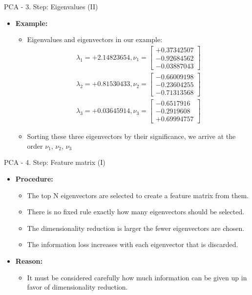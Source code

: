 \begin{frame}{PCA - 3. Step: Eigenvalues (II)}
	\begin{itemize}
		\item \textbf{Example:}
		      \begin{itemize}
			      \item Eigenvalues and eigenvectors in our example: \\
			            \begin{align*}
				            \lambda_1 = +2.14823654,
				            \nu_1 = \begin{bmatrix} +0.37342507 \\ -0.92684562 \\ -0.03887043 \end{bmatrix}
				            \\
				            \lambda_2 = +0.81530433,
				            \nu_2 = \begin{bmatrix} -0.66009198 \\ -0.23604255 \\ -0.71313568 \end{bmatrix}
				            \\
				            \lambda_3 = +0.03645914,
				            \nu_3 = \begin{bmatrix} -0.6517916 \\ -0.2919608 \\ +0.69994757 \end{bmatrix}
			            \end{align*}
			      \item Sorting these three eigenvectors by their significance, we
			            arrive at the order $\nu_1$, $\nu_2$, $\nu_3$
		      \end{itemize}
	\end{itemize}
\end{frame}

\begin{frame}{PCA - 4. Step: Feature matrix (I)}
	\begin{itemize}
		\item \textbf{Procedure:}
		      \begin{itemize}
			      \item The top N eigenvectors are selected to create a feature
			            matrix from them.
			      \item There is no fixed rule exactly how many eigenvectors should
			            be selected.
			      \item The dimensionality reduction is larger the
			            fewer eigenvectors are chosen.
			      \item The information loss increases with each eigenvector that is
			            discarded.
		      \end{itemize}
		\item \textbf{Reason:}
		      \begin{itemize}
			      \item It must be considered carefully how much information can be
			            given up in favor of dimensionality reduction.
		      \end{itemize}
	\end{itemize}
\end{frame}

